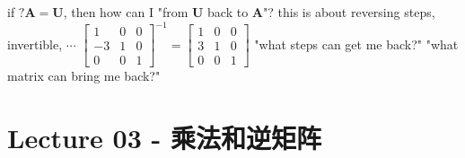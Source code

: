 \documentclass[12pt, a4paper]{article}
\begin{document}
\vspace{14pt}
\newline
if ${\mathbf{\boxed{?}}}{\mathbf{A}} = {\mathbf{U}}$, then how can I "from ${\mathbf{U}}$ back to ${\mathbf{A}}$"?
\newline
this is about reversing steps, invertible, $\cdots$
\newline
\begin{math}
	\begin{bmatrix}
		1 & 0 & 0 \\
		-3 & 1 & 0 \\
		0 & 0 & 1
	\end{bmatrix}^{-1}
	 = 
	\begin{bmatrix}
		1 & 0 & 0 \\
		3 & 1 & 0 \\
		0 & 0 & 1
	\end{bmatrix}
\end{math}
\newline
"what steps can get me back?"
\newline
"what matrix can bring me back?"

\newpage
\section{Lecture 03 - 乘法和逆矩阵}
\pagestyle{fancy}
\lhead{}
\rhead{}
\end{document}

